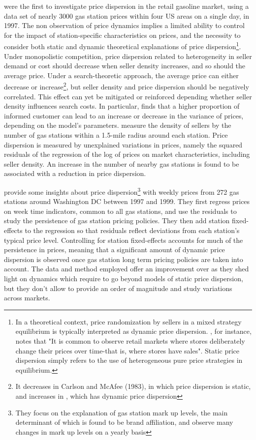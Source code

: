 \documentclass[english]{article}
\begin{document}
\cite{BAR04} were the first to investigate price dispersion in the retail gasoline market, using a data set of nearly 3000 gas station prices within four US areas on a single day, in 1997. The non observation of price dynamics implies a limited ability to control for the impact of station-specific characteristics on prices, and the necessity to consider both static and dynamic theoretical explanations of price dispersion\footnote{In a theoretical context, price randomization by sellers in a mixed strategy equilibrium is typically interpreted as dynamic price dispersion. \cite{VAR80}, for instance, notes that "It is common to observe retail markets where stores deliberately change their prices over time-that is, where stores have sales". Static price dispersion simply refers to the use of heterogeneous pure price strategies in equilibrium.}. Under monopolistic competition, price dispersion related to heterogeneity in seller demand or cost should decrease when seller density increases, and so should the average price. Under a search-theoretic approach, the average price can either decrease or increase\footnote{It decreases in Carlson and McAfee (1983), in which price dispersion is static, and increases in \cite{VAR80}, which has dynamic price dispersion}, but  seller density and price dispersion should be negatively correlated. This effect can yet be mitigated or reinforced depending whether seller density influences search costs. In particular, \cite{VAR80} finds that a higher proportion of informed customer can lead to an increase or decrease in the variance of prices, depending on the model's parameters. \cite{BAR04} measure the density of sellers by the number of gas stations within a 1.5-mile radius around each station. Price dispersion is measured by unexplained variations in prices, namely the squared residuals of the regression of the log of prices on market characteristics, including seller density. An increase in the number of nearby gas stations is found to be associated with a reduction in price dispersion.

\cite{HOS08} provide some insights about price dispersion\footnote{They focus on the explanation of gas station mark up levels, the main determinant of which is found to be brand affiliation, and observe many changes in mark up levels  on a yearly basis} with weekly prices from 272 gas stations around Washington DC  between 1997 and 1999. They first regress prices on week time indicators, common to all gas stations, and use the residuals to study the persistence of gas station pricing policies. They then add station fixed-effects to the regression so that residuals reflect deviations from each station's typical price level. Controlling for station fixed-effects accounts for much of the persistence in prices, meaning that a significant amount of dynamic price dispersion is observed once gas station long term pricing policies are taken into account.  The data and method employed offer an improvement over \cite{BAR04} as they shed light on dynamics which require to go beyond models of static price dispersion, but they don't allow to provide an order of magnitude and study variations across markets.
\end{document}
